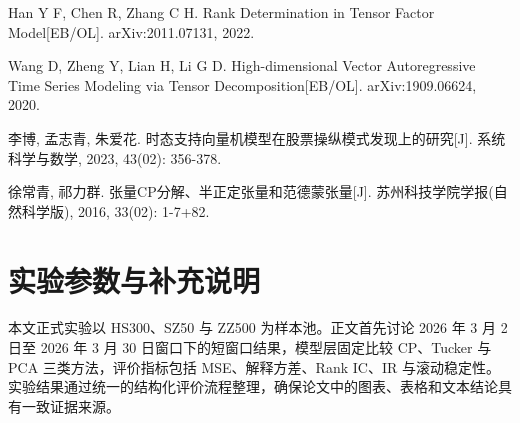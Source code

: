 \begin{enumerate}[label={[\arabic*]}]
  \item Han Y F, Chen R, Zhang C H. Rank Determination in Tensor Factor Model[EB/OL]. arXiv:2011.07131, 2022.
  \item Wang D, Zheng Y, Lian H, Li G D. High-dimensional Vector Autoregressive Time Series Modeling via Tensor Decomposition[EB/OL]. arXiv:1909.06624, 2020.
  \item 李博, 孟志青, 朱爱花. 时态支持向量机模型在股票操纵模式发现上的研究[J]. 系统科学与数学, 2023, 43(02): 356-378.
  \item 徐常青, 祁力群. 张量CP分解、半正定张量和范德蒙张量[J]. 苏州科技学院学报(自然科学版), 2016, 33(02): 1-7+82.
\end{enumerate}

\appendix
\chapter{实验参数与补充说明}

本文正式实验以 HS300、SZ50 与 ZZ500 为样本池。正文首先讨论 2026 年 3 月 2 日至 2026 年 3 月 30 日窗口下的短窗口结果，模型层固定比较 CP、Tucker 与 PCA 三类方法，评价指标包括 MSE、解释方差、Rank IC、IR 与滚动稳定性。实验结果通过统一的结构化评价流程整理，确保论文中的图表、表格和文本结论具有一致证据来源。
